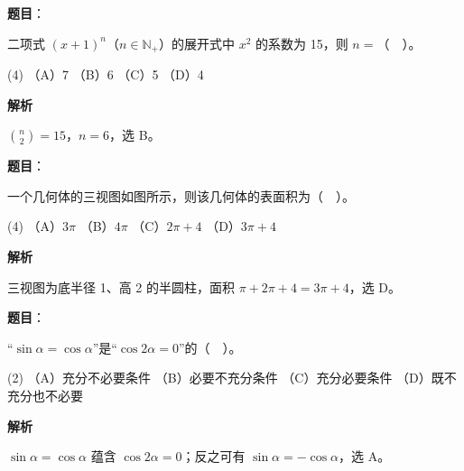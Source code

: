 \begin{answer}

\textbf{题目}：

二项式 $(x+1)^n$（$n\in\mathbb N_+$）的展开式中 $x^2$ 的系数为 15，则 $n=$（　）。

\begin{gkopts}(4)
\task （A）7
\task （B）6
\task （C）5
\task （D）4
\end{gkopts}

\textbf{解析}

$\binom n2=15$，$n=6$，选 B。


\end{answer}
\begin{answer}

\textbf{题目}：

一个几何体的三视图如图所示，则该几何体的表面积为（　）。
\nopagebreak[4]
\begin{center}\end{center}
\nopagebreak[4]
\begin{gkopts}(4)
\task （A）$3\pi$
\task （B）$4\pi$
\task （C）$2\pi+4$
\task （D）$3\pi+4$
\end{gkopts}

\textbf{解析}

三视图为底半径 1、高 2 的半圆柱，面积 $\pi+2\pi+4=3\pi+4$，选 D。


\end{answer}
\begin{answer}

\textbf{题目}：

“$\sin\alpha=\cos\alpha$”是“$\cos2\alpha=0$”的（　）。

\begin{gkopts}(2)
\task （A）充分不必要条件
\task （B）必要不充分条件
\task （C）充分必要条件
\task （D）既不充分也不必要
\end{gkopts}

\textbf{解析}

$\sin\alpha=\cos\alpha$ 蕴含 $\cos2\alpha=0$；反之可有 $\sin\alpha=-\cos\alpha$，选 A。


\end{answer}
